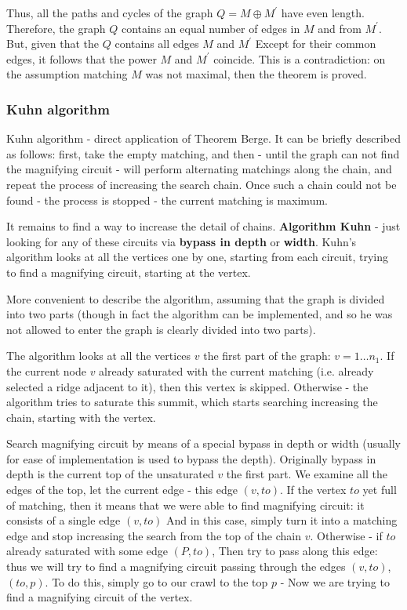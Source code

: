Thus, all the paths and cycles of the graph $Q = M \oplus M ^ \prime$ have even length. Therefore, the graph $Q$ contains an equal number of edges in $M$ and from $M ^ \prime$. But, given that the $Q$ contains all edges $M$ and $M ^ \prime$ Except for their common edges, it follows that the power $M$ and $M ^ \prime$ coincide. This is a contradiction: on the assumption matching $M$ was not maximal, then the theorem is proved.

\subsubsection{ Kuhn algorithm }

Kuhn algorithm - direct application of Theorem Berge. It can be briefly described as follows: first, take the empty matching, and then - until the graph can not find the magnifying circuit - will perform alternating matchings along the chain, and repeat the process of increasing the search chain. Once such a chain could not be found - the process is stopped - the current matching is maximum.

It remains to find a way to increase the detail of chains. \textbf{Algorithm Kuhn} - just looking for any of these circuits via \textbf{bypass in depth} or \textbf{width}. Kuhn's algorithm looks at all the vertices one by one, starting from each circuit, trying to find a magnifying circuit, starting at the vertex.

More convenient to describe the algorithm, assuming that the graph is divided into two parts (though in fact the algorithm can be implemented, and so he was not allowed to enter the graph is clearly divided into two parts).

The algorithm looks at all the vertices $v$ the first part of the graph: $v = 1 \ldots n_1$. If the current node $v$ already saturated with the current matching (i.e. already selected a ridge adjacent to it), then this vertex is skipped. Otherwise - the algorithm tries to saturate this summit, which starts searching increasing the chain, starting with the vertex.

Search magnifying circuit by means of a special bypass in depth or width (usually for ease of implementation is used to bypass the depth). Originally bypass in depth is the current top of the unsaturated $v$ the first part. We examine all the edges of the top, let the current edge - this edge $(v, to)$. If the vertex $to$ yet full of matching, then it means that we were able to find magnifying circuit: it consists of a single edge $(v, to)$ And in this case, simply turn it into a matching edge and stop increasing the search from the top of the chain $v$. Otherwise - if $to$ already saturated with some edge $(P, to)$, Then try to pass along this edge: thus we will try to find a magnifying circuit passing through the edges $(v, to)$, $(to, p)$. To do this, simply go to our crawl to the top $p$ - Now we are trying to find a magnifying circuit of the vertex.

